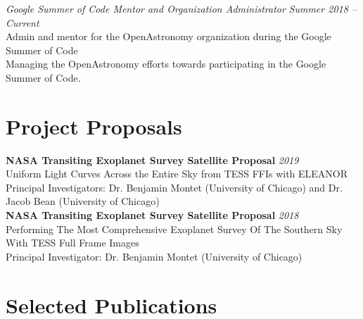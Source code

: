 \documentclass[10pt]{article}
\begin{document}
\begin{titlepage}
\emph{Google Summer of Code Mentor and Organization Administrator} \hfill \textit{Summer 2018 -- Current}
\\Admin and mentor for the OpenAstronomy organization during the Google Summer of Code
\\ {\small Managing the OpenAstronomy efforts towards participating in the Google Summer of Code.}
\vspace{.5cm}


\section*{Project Proposals}
    \textbf{NASA Transiting Exoplanet Survey Satellite Proposal}
    \hfill \textit{2019}\\
    Uniform Light Curves Across the Entire Sky from TESS FFIs with ELEANOR\\
    {\small Principal Investigators: Dr. Benjamin Montet (University of Chicago) and Dr. Jacob Bean (University of Chicago)}\\

    \textbf{NASA Transiting Exoplanet Survey Satellite Proposal}
    \hfill \textit{2018}\\
    Performing The Most Comprehensive Exoplanet Survey Of The Southern Sky With TESS Full Frame Images\\
    {\small Principal Investigator: Dr. Benjamin Montet (University of Chicago)}

\section*{Selected Publications}


\end{titlepage}
\end{document}
